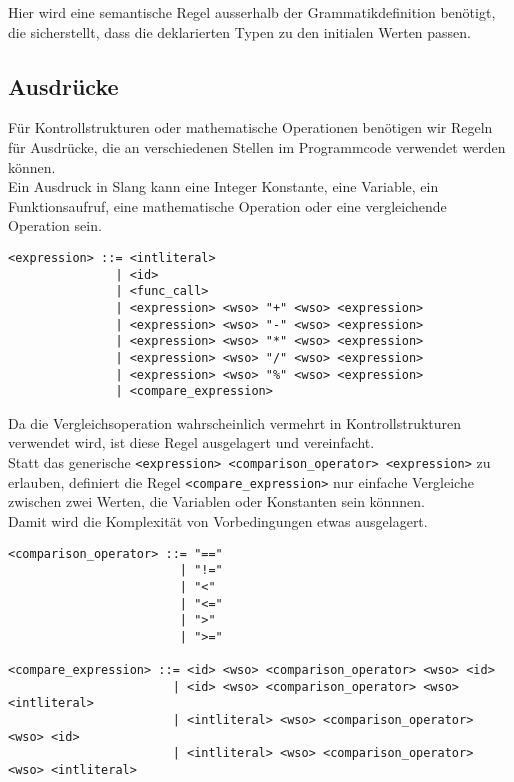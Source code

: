 Hier wird eine semantische Regel ausserhalb der Grammatikdefinition benötigt, die sicherstellt, dass die deklarierten Typen zu den initialen Werten passen.\\

\subsection{Ausdrücke}

Für Kontrollstrukturen oder mathematische Operationen benötigen wir Regeln für Ausdrücke, die an verschiedenen Stellen im Programmcode verwendet werden können.\\
Ein Ausdruck in Slang kann eine Integer Konstante, eine Variable, ein Funktionsaufruf, eine mathematische Operation oder eine vergleichende Operation sein.

\begin{lstlisting}[caption={Grammatikdefinition Ausdrücke}]
<expression> ::= <intliteral>
               | <id>
               | <func_call>
               | <expression> <wso> "+" <wso> <expression>
               | <expression> <wso> "-" <wso> <expression>
               | <expression> <wso> "*" <wso> <expression>
               | <expression> <wso> "/" <wso> <expression>
               | <expression> <wso> "%" <wso> <expression>
               | <compare_expression>
\end{lstlisting}

Da die Vergleichsoperation wahrscheinlich vermehrt in Kontrollstrukturen verwendet wird, ist diese Regel ausgelagert und vereinfacht.\\
Statt das generische \texttt{<expression> <comparison\_operator> <expression>} zu erlauben, definiert die Regel \texttt{<compare\_expression>} nur einfache Vergleiche zwischen zwei Werten, die Variablen  oder Konstanten sein könnnen.\\
Damit wird die Komplexität von Vorbedingungen etwas ausgelagert.

\begin{lstlisting}[caption={Grammatikdefinition Vergleichsausdrücke}]
<comparison_operator> ::= "=="
                        | "!="
                        | "<"
                        | "<="
                        | ">"
                        | ">="

<compare_expression> ::= <id> <wso> <comparison_operator> <wso> <id>
                       | <id> <wso> <comparison_operator> <wso> <intliteral>
                       | <intliteral> <wso> <comparison_operator> <wso> <id>
                       | <intliteral> <wso> <comparison_operator> <wso> <intliteral>
\end{lstlisting}

